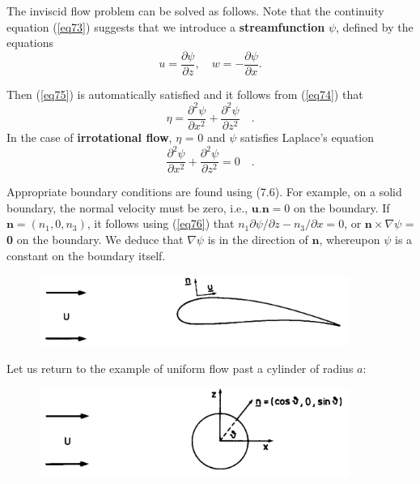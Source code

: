 \documentclass[10pt]{report}
\begin{document}
The inviscid flow problem can be solved as follows. Note that the continuity
equation (\ref{eq73}) suggests that we introduce a \textbf{streamfunction} $\psi $,
defined by the equations
\begin{equation}
u=\frac{\partial \psi }{\partial z}, \quad w=-\frac{\partial \psi }{\partial
x}.
\label{eq76}
\end{equation}

Then (\ref{eq75}) is automatically satisfied and it follows from (\ref{eq74}) that
\begin{equation}
\eta =\frac{\partial ^2\psi }{\partial x^2}+\frac{\partial ^2\psi
}{\partial z^2}\quad .
\end{equation}
In the case of \textbf{irrotational flow}, $\eta $ = 0 and $\psi $ satisfies
Laplace's equation
\begin{equation}
\label{eq77}
\frac{\partial ^2\psi }{\partial x^2}+\frac{\partial ^2\psi }{\partial
z^2}=0\quad .
\end{equation}

Appropriate boundary conditions are found using (7.6). For example, on a
solid boundary, the normal velocity must be zero, i.e., $ \textbf{u} .
\textbf{n} = 0$ on the boundary. If $ \textbf{n} = (n_{1}, 0, n_{3})$, it
follows using (\ref{eq76}) that $n_1 {\partial \psi } /
{\partial z-n_3 } / {\partial x}=0$, or
$\textbf{n} \times  \nabla \psi $ = \textbf{0} on the boundary. We
deduce that $\nabla \psi $ is in the direction of  $\textbf{n}$, whereupon
$\psi $ is a constant on the boundary itself.

\begin{figure}[htbp]
\centerline{\includegraphics[width=4in]{Section72.pdf}}
\caption{ }
\label{fig5.2}
\end{figure}

Let us return to the example of uniform flow past a cylinder of radius $a$:

\begin{figure}[htbp]
\centerline{\includegraphics[width=4in]{Section73.pdf}}
\caption{ }
\label{fig5.3}
\end{figure}
\end{document}
